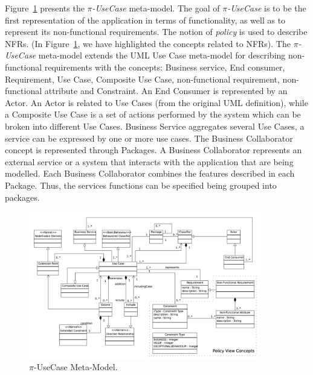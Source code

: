 Figure~\ref{fig:CIM:usecasemetamodel} presents the \textit{$\pi$-UseCase} meta-model.
The goal of \textit{$\pi$-UseCase}  is to be the first representation of the application in terms of functionality, as well as to represent its non-functional requirements.
The notion of \textit{policy} is used to describe NFRs. 
(In Figure~\ref{fig:CIM:usecasemetamodel}, we have highlighted the concepts related to NFRs).
The \textit{$\pi$-UseCase} meta-model extends the UML Use Case meta-model for describing non-functional requirements with  the concepts:  {\sc Business service}, {\sc End consumer}, {\sc Requirement}, {\sc Use Case}, {\sc Composite Use Case}, {\sc non-functional requirement}, {\sc non-functional attribute} and {\sc Constraint}. An {\sc End Consumer} is represented by an {\sc Actor}. An  {\sc Actor} is related to {\sc Use Cases} (from the original UML definition), while a {\sc  Composite Use Case} is a set of actions performed by the system which can be broken into different {\sc Use Cases}.
{\sc  Business Service} aggregates several {\sc Use Cases},  a service can be expressed by one or more use cases.
 The {\sc Business Collaborator} concept is represented  through {\sc Packages}. 
A {\sc Business Collaborator} represents an external service or a system that interacts with the application that are being modelled. 
Each {\sc Business Collaborator} combines the features described in each  {\sc Package}. 
Thus, the services functions can be specified being grouped into packages.
 
 \begin{figure}[htpb]
\center
\includegraphics[width=0.9\textwidth]{figs/UseCaseMetaModel.pdf}
\caption{\label{fig:CIM:usecasemetamodel} $\pi$-UseCase Meta-Model.}
\end{figure}


